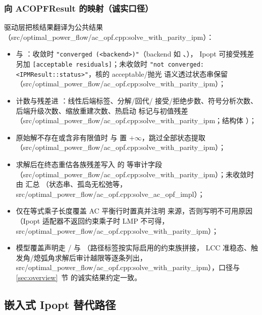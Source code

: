 \subsubsection*{向 ACOPFResult 的映射（诚实口径）}
驱动层把核结果翻译为公共结果（src/optimal\_power\_flow/ac\_opf.cpp:solve\_with\_parity\_ipm）：
\begin{itemize}
  \item {} 与 ：收敛时
        \texttt{"converged (<backend>)"}（backend 如
        、），
        Ipopt 可接受残差另加 \texttt{[acceptable residuals]}；未收敛时
        \texttt{"not converged: <IPMResult::status>"}，核的 acceptable/抛光
        语义透过状态串保留（src/optimal\_power\_flow/ac\_opf.cpp:solve\_with\_parity\_ipm）；
  \item 计数与残差进 ：线性后端标签、分解/回代/
        接受/拒绝步数、符号分析次数、后端升级次数、缩放重建次数、热启动
        标记与初值残差（src/optimal\_power\_flow/ac\_opf.cpp:solve\_with\_parity\_ipm；结构体
        ）；
  \item 原始解不存在或含非有限值时  与
         置 $+\infty$，跳过全部状态提取
        （src/optimal\_power\_flow/ac\_opf.cpp:solve\_with\_parity\_ipm）；
  \item 求解后在终态重估各族残差写入  的
         等审计字段
        （src/optimal\_power\_flow/ac\_opf.cpp:solve\_with\_parity\_ipm）；未收敛时由 
        汇总 （状态串、孤岛无松弛等，
        src/optimal\_power\_flow/ac\_opf.cpp:solve\_ac\_opf\_impl）；
  \item {} 仅在等式乘子长度覆盖 AC 平衡行时置真并注明
        来源，否则写明不可用原因（Ipopt 适配器不返回约束乘子时 LMP
        不可得，src/optimal\_power\_flow/ac\_opf.cpp:solve\_with\_parity\_ipm）；
  \item 模型覆盖声明走 /
        与 （路径标签按实际启用的约束族拼接，
        LCC 准稳态、触发角/熄弧角求解后审计越限等逐条列出，
        src/optimal\_power\_flow/ac\_opf.cpp:solve\_with\_parity\_ipm），口径与 \ref{sec:overview}~节
        的诚实结果约定一致。
\end{itemize}

\subsection{嵌入式 Ipopt 替代路径}\label{subsec:pipm-ipopt}


